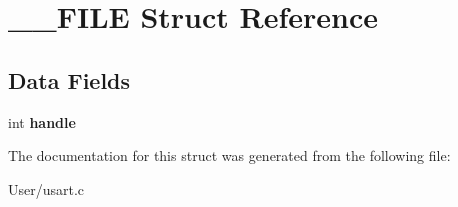 \hypertarget{struct_____f_i_l_e}{}\section{\+\_\+\+\_\+\+F\+I\+L\+E Struct Reference}
\label{struct_____f_i_l_e}
\subsection*{Data Fields}
\begin{DoxyCompactItemize}
\item 
\hypertarget{struct_____f_i_l_e_a3127ebf018e9da62fa464d348352037d}{}int {\bfseries handle}\label{struct_____f_i_l_e_a3127ebf018e9da62fa464d348352037d}

\end{DoxyCompactItemize}


The documentation for this struct was generated from the following file\+:\begin{DoxyCompactItemize}
\item 
User/usart.\+c\end{DoxyCompactItemize}
